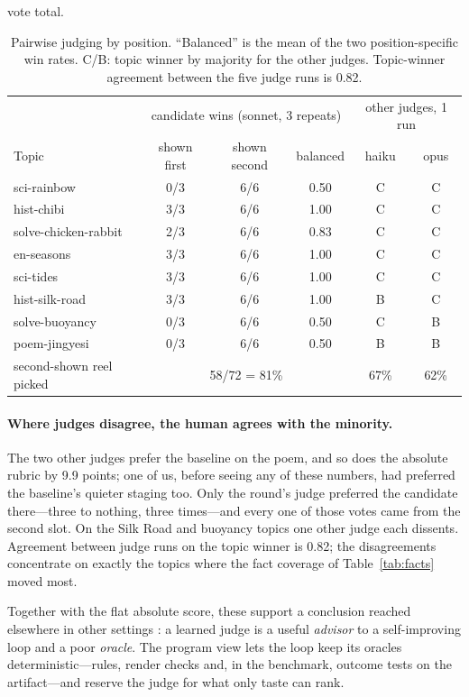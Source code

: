 \documentclass[11pt]{article}
\begin{document}
vote total.
\begin{table}[t]
\centering\small
\begin{tabular}{lccc|cc}
\toprule
 & \multicolumn{3}{c|}{candidate wins (sonnet, 3 repeats)} & \multicolumn{2}{c}{other judges, 1 run} \\
Topic & shown first & shown second & balanced & haiku & opus \\
\midrule
sci-rainbow & 0/3 & 6/6 & 0.50 & C & C \\
hist-chibi & 3/3 & 6/6 & 1.00 & C & C \\
solve-chicken-rabbit & 2/3 & 6/6 & 0.83 & C & C \\
en-seasons & 3/3 & 6/6 & 1.00 & C & C \\
sci-tides & 3/3 & 6/6 & 1.00 & C & C \\
hist-silk-road & 3/3 & 6/6 & 1.00 & B & C \\
solve-buoyancy & 0/3 & 6/6 & 0.50 & C & B \\
poem-jingyesi & 0/3 & 6/6 & 0.50 & B & B \\
\midrule
second-shown reel picked & \multicolumn{3}{c|}{58/72 = 81\%} & 67\% & 62\% \\
\bottomrule
\end{tabular}
\caption{Pairwise judging by position. ``Balanced'' is the mean of the two position-specific win
rates. C/B: topic winner by majority for the other judges. Topic-winner agreement between the five
judge runs is 0.82.}
\label{tab:position}
\end{table}

\paragraph{Where judges disagree, the human agrees with the minority.} The two other judges prefer the
baseline on the poem, and so does the absolute rubric by 9.9 points; one of us, before seeing any of
these numbers, had preferred the baseline's quieter staging too. Only the round's judge preferred the
candidate there---three to nothing, three times---and every one of those votes came from the second
slot. On the Silk Road and buoyancy topics one other judge each dissents. Agreement between judge runs
on the topic winner is 0.82; the disagreements concentrate on exactly the topics where the fact
coverage of Table~\ref{tab:facts} moved most.


Together with the flat absolute score, these support a conclusion reached elsewhere in other
settings \citep{notanoracle2026,moreconvincing2026,teachingmonster2026}: a learned judge is a useful
\emph{advisor} to a self-improving loop and a poor \emph{oracle}. The program view lets the loop keep
its oracles deterministic---rules, render checks and, in the benchmark, outcome tests on the
artifact---and reserve the judge for what only taste can rank.
\end{document}
